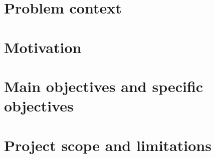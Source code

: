 \section{Problem context}

\section{Motivation}

\section{Main objectives and specific objectives}

\section{Project scope and limitations}